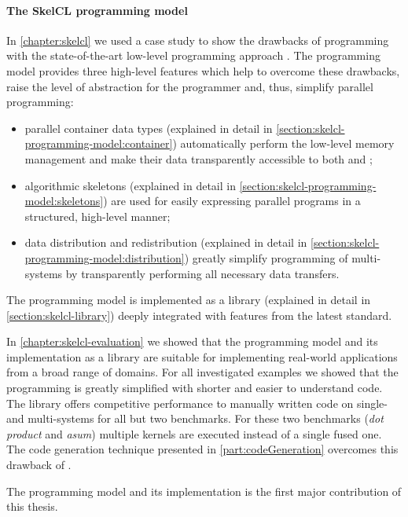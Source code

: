 \paragraph{The SkelCL programming model}
In \autoref{chapter:skelcl} we used a case study to show the drawbacks of programming with the state-of-the-art low-level programming approach \OpenCL.
The \SkelCL programming model provides three high-level features which help to overcome these drawbacks, raise the level of abstraction for the programmer and, thus, simplify parallel programming:
\begin{itemize}
  \item parallel container data types (explained in detail in \autoref{section:skelcl-programming-model:container}) automatically perform the low-level memory management and make their data transparently accessible to both \CPU and \GPUs;
  \item algorithmic skeletons (explained in detail in \autoref{section:skelcl-programming-model:skeletons}) are used for easily expressing parallel programs in a structured, high-level manner;
  \item data distribution and redistribution (explained in detail in \autoref{section:skelcl-programming-model:distribution}) greatly simplify programming of multi-\GPU systems by transparently performing all necessary data transfers.
\end{itemize}

\noindent
The \SkelCL programming model is implemented as a \Cpp library (explained in detail in \autoref{section:skelcl-library}) deeply integrated with features from the latest \Cpp standard.

In \autoref{chapter:skelcl-evaluation} we showed that the \SkelCL programming model and its implementation as a \Cpp library are suitable for implementing real-world applications from a broad range of domains.
For all investigated examples we showed that the programming is greatly simplified with shorter and easier to understand code.
The \SkelCL library offers competitive performance to manually written \OpenCL code on single- and multi-\GPU systems for all but two benchmarks.
For these two benchmarks (\emph{dot product} and \emph{asum}) multiple \OpenCL kernels are executed instead of a single fused one.
The code generation technique presented in \autoref{part:codeGeneration} overcomes this drawback of \SkelCL.

\bigskip
The \SkelCL programming model and its implementation is the first major contribution of this thesis.

